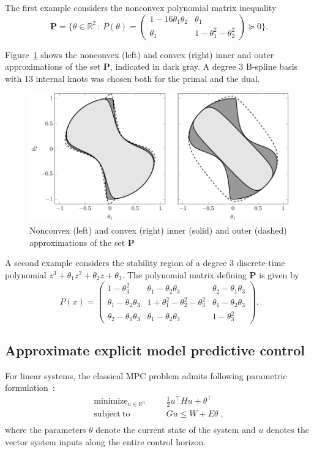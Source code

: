 \documentclass{article}
\DeclareMathOperator*{\minimize}{minimize}
\DeclareMathOperator*{\subj}{subject\;to}
\newcommand{\R}{\mathbb{R}}         %
\renewcommand{\t}{\intercal}        %
\newcommand{\ppar}{\theta}                          %
\begin{document}
The first example considers the nonconvex polynomial matrix inequality
\[
\mathbf{P} = \{\ppar \in \R^2 \, : \, P(\ppar) = \begin{pmatrix} 1 - 16\ppar_1
\ppar_2 & \ppar_1 \\ \ppar_1 & 1 - \ppar_1^2 - \ppar_2^2 \end{pmatrix} \succeq
0 \}.
\]

Figure~\ref{fig:PMI1_Henrion2012} shows the nonconvex (left) and convex
(right) inner and outer approximations of the set $\mathbf{P}$, indicated in
dark gray. A degree 3 B-spline basis with 13 internal knots was chosen both
for the primal and the dual.

\begin{figure}
\centering
\includegraphics{figures/PMI1_Henrion2012_tikz.pdf}
\caption{Nonconvex (left) and convex (right) inner (solid) and outer (dashed)
approximations of the set $\mathbf{P}$}\label{fig:PMI1_Henrion2012}
\end{figure}

A second example considers the stability region of a degree 3 discrete-time
polynomial $z^3 + \ppar_1 z^2  + \ppar_2 z + \ppar_3$. The polynomial matrix
defining $\mathbf{P}$ is given by
\[
P(x) = \begin{pmatrix}
1 - \ppar_3^2 & \ppar_1 - \ppar_2 \ppar_3 & \ppar_2 - \ppar_1 \ppar_3 \\
\ppar_1 - \ppar_2 \ppar_3 & 1 + \ppar_1^2 - \ppar_2^2 - \ppar_3^2 & \ppar_1 -
\ppar_2 \ppar_3 \\
\ppar_2 - \ppar_1 \ppar_3 & \ppar_1 - \ppar_2 \ppar_3 & 1 - \ppar_3^2
\end{pmatrix}.
\]

\subsection{Approximate explicit model predictive control}
For linear systems, the classical MPC problem admits following parametric
formulation~\cite{Bemporad_et_al_2002}:
\[
\begin{aligned}
\minimize_{u \in \R^n} &&& \frac{1}{2} u^\t H u + \ppar^\t  \\
\subj              &&& Gu \leq W + E\ppar \; ,  \\
\end{aligned}
\]
where the parameters $\ppar$ denote the current state of the system and $u$
denotes the vector system inputs along the entire control horizon.
\end{document}
